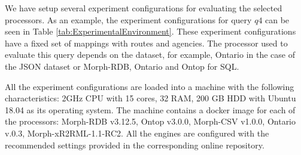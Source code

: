 We have setup several experiment configurations for evaluating the selected processors. As an example, the experiment configurations for query $q4$ can be seen in Table \ref{tab:ExperimentalEnvironment}. These experiment configurations have a fixed set of mappings with routes and agencies. The processor used to evaluate this query depends on the dataset, for example, Ontario in the case of the JSON dataset or Morph-RDB, Ontario and Ontop for SQL.

\begin{table}[]
\centering
\caption{\textbf{Experiment configuration example set.} List of experimental configurations and processors for q4. $D$ is a dataset where $s$ is the scaling factor (i.e., 1, 5, 10, 50, 100, 500), $M$ is the set of mappings, $q$ is the SPARQL query, $\phi$ is a processor. $q$ is a SPARQL query defined in the Appendix Section.}
\label{tab:ExperimentalEnvironment}
\end{table}


All the experiment configurations are loaded into a machine with the following characteristics: 2GHz CPU with 15 cores, 32 RAM, 200 GB HDD with Ubuntu 18.04 as its operating system. The machine contains a docker image for each of the processors: Morph-RDB v3.12.5, Ontop v3.0.0, Morph-CSV v1.0.0, Ontario v.0.3, Morph-xR2RML-1.1-RC2. All the engines are configured with the recommended settings provided in the corresponding online repository. 

